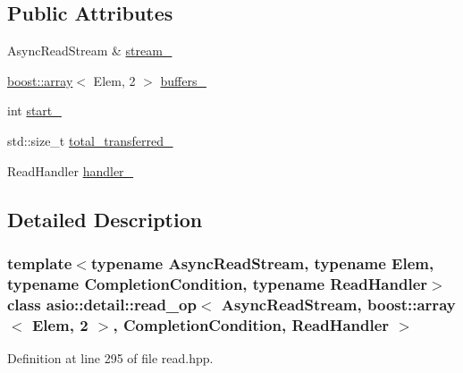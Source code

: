 \subsection*{Public Attributes}
\begin{DoxyCompactItemize}
\item 
Async\+Read\+Stream \& \hyperlink{classasio_1_1detail_1_1read__op_3_01_async_read_stream_00_01boost_1_1array_3_01_elem_00_012_01_4b92266d3d5081f809423aa72530eb694_ae1ff805a209a3733d72034de4653d49d}{stream\+\_\+}
\item 
\hyperlink{classboost_1_1array}{boost\+::array}$<$ Elem, 2 $>$ \hyperlink{classasio_1_1detail_1_1read__op_3_01_async_read_stream_00_01boost_1_1array_3_01_elem_00_012_01_4b92266d3d5081f809423aa72530eb694_ab65f59214d47a7bbcc1a6d713403a169}{buffers\+\_\+}
\item 
int \hyperlink{classasio_1_1detail_1_1read__op_3_01_async_read_stream_00_01boost_1_1array_3_01_elem_00_012_01_4b92266d3d5081f809423aa72530eb694_a41729b92e635fb507621c00b1d011395}{start\+\_\+}
\item 
std\+::size\+\_\+t \hyperlink{classasio_1_1detail_1_1read__op_3_01_async_read_stream_00_01boost_1_1array_3_01_elem_00_012_01_4b92266d3d5081f809423aa72530eb694_a049016ef13e857b0d5875dc63e5fd053}{total\+\_\+transferred\+\_\+}
\item 
Read\+Handler \hyperlink{classasio_1_1detail_1_1read__op_3_01_async_read_stream_00_01boost_1_1array_3_01_elem_00_012_01_4b92266d3d5081f809423aa72530eb694_a1fc8ad539a1d58ecd25ac32e4ad20519}{handler\+\_\+}
\end{DoxyCompactItemize}


\subsection{Detailed Description}
\subsubsection*{template$<$typename Async\+Read\+Stream, typename Elem, typename Completion\+Condition, typename Read\+Handler$>$class asio\+::detail\+::read\+\_\+op$<$ Async\+Read\+Stream, boost\+::array$<$ Elem, 2 $>$,                           Completion\+Condition, Read\+Handler $>$}



Definition at line 295 of file read.\+hpp.



